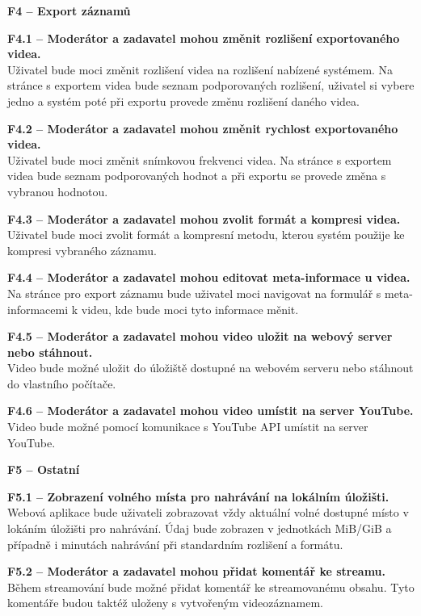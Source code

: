\documentclass[thesis=M,czech]{FITthesis}[2012/06/26]
\begin{document}
\begin{description}
  \item \textbf{F4 -- Export záznamů}
  \begin{description}
    \item \textbf{F4.1 -- Moderátor a zadavatel mohou změnit rozlišení exportovaného videa.\\}
	Uživatel bude moci změnit rozlišení videa na rozlišení nabízené systémem. Na stránce s exportem videa bude seznam podporovaných rozlišení, uživatel si vybere jedno a systém poté při exportu provede změnu rozlišení daného videa.
    \item \textbf{F4.2 -- Moderátor a zadavatel mohou změnit rychlost exportovaného videa.\\}
	Uživatel bude moci změnit snímkovou frekvenci videa. Na stránce s exportem videa bude seznam podporovaných hodnot a při exportu se provede změna s vybranou hodnotou.
    \item \textbf{F4.3 -- Moderátor a zadavatel mohou zvolit formát a kompresi videa.\\}
	Uživatel bude moci zvolit formát a kompresní metodu, kterou systém použije ke kompresi vybraného záznamu.
    \item \textbf{F4.4 -- Moderátor a zadavatel mohou editovat meta-informace u videa.\\}
	Na stránce pro export záznamu bude uživatel moci navigovat na formulář s meta-informacemi k videu, kde bude moci tyto informace měnit.
    \item \textbf{F4.5 -- Moderátor a zadavatel mohou video uložit na webový server nebo stáhnout.\\}
	Video bude možné uložit do úložiště dostupné na webovém serveru nebo stáhnout do vlastního počítače.
    \item \textbf{F4.6 -- Moderátor a zadavatel mohou video umístit na server YouTube.\\}
	Video bude možné pomocí komunikace s YouTube API umístit na server YouTube.
  \end{description}

  \item \textbf{F5 -- Ostatní}
  \begin{description}
    \item \textbf{F5.1 -- Zobrazení volného místa pro nahrávání na lokálním úložišti.\\}
    Webová aplikace bude uživateli zobrazovat vždy aktuální volné dostupné místo v lokáním úložišti pro nahrávání. Údaj bude zobrazen v jednotkách MiB/GiB a případně i minutách nahrávání při standardním rozlišení a formátu.
    \item \textbf{F5.2 -- Moderátor a zadavatel mohou přidat komentář ke streamu.\\}
	Během streamování bude možné přidat komentář ke streamovanému obsahu. Tyto komentáře budou taktéž uloženy s vytvořeným videozáznamem.
  \end{description}
\end{description}
\end{document}
